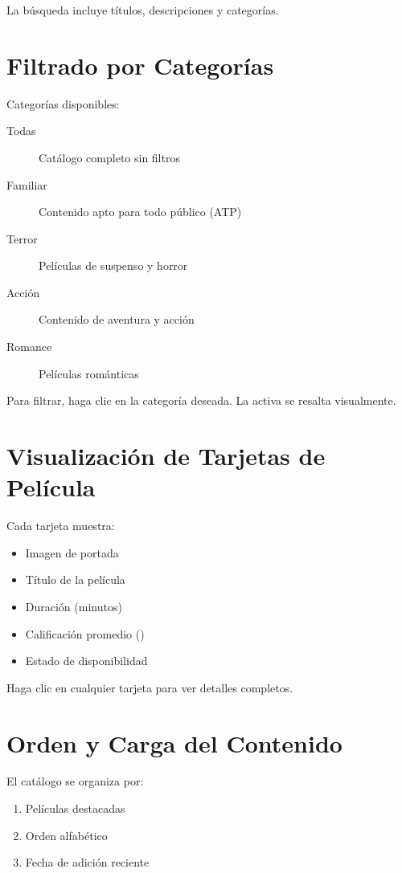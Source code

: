 \documentclass[11pt,a4paper,twoside]{book}
\begin{document}
\begin{infobox}
La búsqueda incluye títulos, descripciones y categorías.
\end{infobox}

\section{Filtrado por Categorías}

Categorías disponibles:

\begin{description}
    \item[Todas] Catálogo completo sin filtros
    \item[Familiar] Contenido apto para todo público (ATP)
    \item[Terror] Películas de suspenso y horror
    \item[Acción] Contenido de aventura y acción
    \item[Romance] Películas románticas
\end{description}

Para filtrar, haga clic en la categoría deseada. La activa se resalta visualmente.

\section{Visualización de Tarjetas de Película}

Cada tarjeta muestra:
\begin{itemize}
    \item Imagen de portada
    \item Título de la película
    \item Duración (minutos)
    \item Calificación promedio (\faStarO)
    \item Estado de disponibilidad
\end{itemize}

Haga clic en cualquier tarjeta para ver detalles completos.

\section{Orden y Carga del Contenido}

El catálogo se organiza por:
\begin{enumerate}
    \item Películas destacadas
    \item Orden alfabético
    \item Fecha de adición reciente
\end{enumerate}
\end{document}
